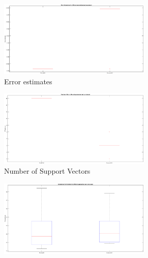 \begin{figure}[!htpb]
	\begin{subfigure}[b]{0.34\textwidth}
		\centering
		\includegraphics[height= 0.65\textwidth, width = 0.8\textwidth]{Exercise3/Report/shuttle_1}
		\caption{Error estimates }\label{fig:shuttle_1}
	\end{subfigure}%
	\begin{subfigure}[b]{0.34\textwidth}
		\centering
		\includegraphics[height= 0.65\textwidth, width = 0.8\textwidth]{Exercise3/Report/shuttle_2}
		\caption{Number of Support Vectors}\label{fig:shuttle_2}
	\end{subfigure}%
	\begin{subfigure}[b]{0.34\textwidth}
		\centering
		\includegraphics[height= 0.65\textwidth, width = 0.8\textwidth]{Exercise3/Report/shuttle_3}

\end{subfigure}
\end{figure}
